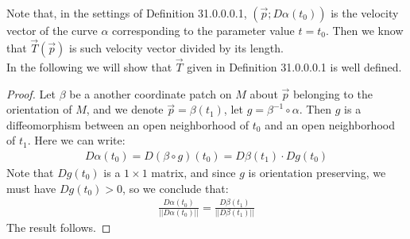 \documentclass[15pt]{book}
\theoremstyle{break}
\theoremstyle{break}
\begin{document}
Note that, in the settings of Definition 31.0.0.0.1, $(\vec{p};D\alpha(t_0))$ is the velocity vector of the curve $\alpha$ corresponding to the parameter value $t = t_0$. Then we know that $\vec{T}(\vec{p})$ is such velocity vector divided by its length. \\

In the following we will show that $\vec{T}$ given in Definition 31.0.0.0.1 is well defined.
\begin{proof}
Let $\beta$ be a another coordinate patch on $M$ about $\vec{p}$ belonging to the orientation of $M$, and we denote $\vec{p} = \beta(t_1)$, let $g = \beta^{-1}\circ \alpha$. Then $g$ is a diffeomorphism between an open neighborhood of $t_0$ and an open neighborhood of $t_1$. Here we can write:
\begin{align*}
D\alpha(t_0) = D(\beta \circ g) (t_0) = D\beta(t_1) \cdot Dg(t_0)
\end{align*}
Note that $Dg(t_0)$ is a $1\times 1$ matrix, and since $g$ is orientation preserving, we must have $Dg(t_0) >0$, so we conclude that:
\begin{align*}
\frac{D\alpha(t_0)}{||D\alpha(t_0)||} = \frac{D\beta(t_1)}{||D\beta(t_1)||} 
\end{align*}
The result follows.
\end{proof}
\end{document}
